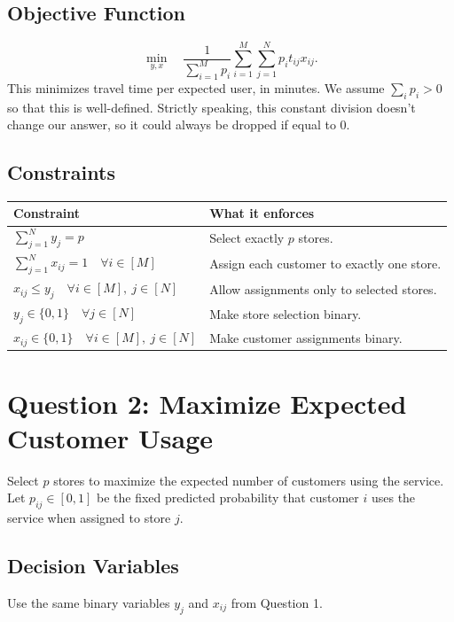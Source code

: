 \documentclass{article}
\begin{document}
\subsection*{Objective Function}
\begin{equation}
\min_{y,x}\quad \frac{1}{\sum_{i=1}^{M}p_i}\sum_{i=1}^{M}\sum_{j=1}^{N}p_i t_{ij}x_{ij}.
\label{eq:expected-time}
\end{equation}
This minimizes travel time per expected user, in minutes. We assume $\sum_i p_i>0$ so that this is well-defined.
Strictly speaking, this constant division doesn't change our answer, so it could always be dropped if equal to 0.

\subsection*{Constraints}
\begin{center}
\begin{tabular}{@{}p{}p{}@{}}
\toprule
\textbf{Constraint} & \textbf{What it enforces} \\
\midrule
$\sum_{j=1}^{N}y_j=p$ & Select exactly $p$ stores. \\[6pt]
$\sum_{j=1}^{N}x_{ij}=1\quad \forall i\in[M]$ & Assign each customer to exactly one store. \\[6pt]
$x_{ij}\le y_j\quad \forall i\in[M],\ j\in[N]$ & Allow assignments only to selected stores. \\[6pt]
$y_j\in\{0,1\}\quad \forall j\in[N]$ & Make store selection binary. \\[6pt]
$x_{ij}\in\{0,1\}\quad \forall i\in[M],\ j\in[N]$ & Make customer assignments binary. \\
\bottomrule
\end{tabular}
\end{center}

\clearpage
\section*{Question 2: Maximize Expected Customer Usage}

Select $p$ stores to maximize the expected number of customers using the service.
Let $p_{ij}\in[0,1]$ be the fixed predicted probability that customer $i$ uses the service when assigned to store $j$.

\subsection*{Decision Variables}
Use the same binary variables $y_j$ and $x_{ij}$ from Question 1.
\end{document}
